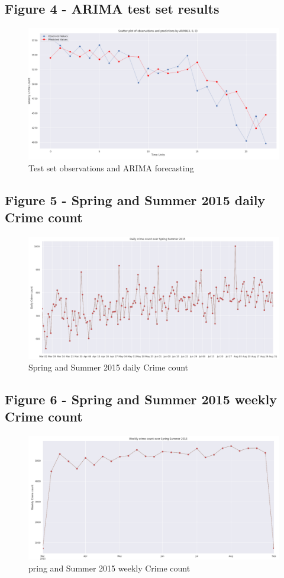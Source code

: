 \documentclass[a4paper, twocolumn]{article}
\begin{document}
\subsection{Figure 4 - ARIMA test set results}\label{appendix:fig5}
\begin{figure}[h]
\includegraphics[width=\textwidth]{fig6.png}
\caption{Test set observations and ARIMA forecasting}
\end{figure}
\newpage

\subsection{Figure 5 - Spring and Summer 2015 daily Crime count}\label{appendix:fig3}
\begin{figure}[h]
\includegraphics[width=\textwidth]{fig3.png}
\caption{Spring and Summer 2015 daily Crime count}
\end{figure}
\newpage

\subsection{Figure 6 - Spring and Summer 2015 weekly Crime count}\label{appendix:fig4}
\begin{figure}[h]
\includegraphics[width=\textwidth]{fig4.png}
\caption{pring and Summer 2015 weekly Crime count}
\end{figure}
\end{document}
